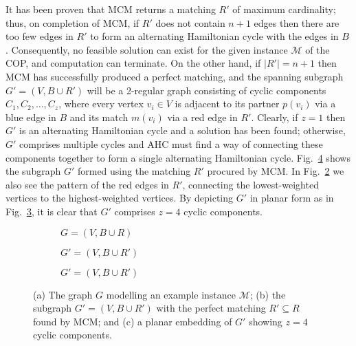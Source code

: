 \documentclass[a4paper,11pt,authoryear]{elsarticle}
\begin{document}
It has been proven that MCM returns a matching $R'$ of maximum cardinality; thus, on completion of MCM, if $R'$ does not contain $n+1$ edges then there are too few edges in $R'$ to form an alternating Hamiltonian cycle with the edges in $B$ \citep{hawa2020t}. Consequently, no feasible solution can exist for the given instance $\mathcal{M}$ of the COP, and computation can terminate. On the other hand, if $|R'|=n+1$ then MCM has successfully produced a perfect matching, and the spanning subgraph $G'=(V, B \cup R')$ will be a 2-regular graph consisting of cyclic components $C_1, C_2,\dotsc,C_z$, where every vertex $v_i \in V$ is adjacent to its partner $p(v_i)$ via a blue edge in $B$ and its match $m(v_i)$ via a red edge in $R'$. Clearly, if $z=1$ then $G'$ is an alternating Hamiltonian cycle and a solution has been found; otherwise, $G'$ comprises multiple cycles and AHC must find a way of connecting these components together to form a single alternating Hamiltonian cycle. Fig.~\ref{fig:mcm} shows the subgraph $G'$ formed using the matching $R'$ procured by MCM. In Fig.~\ref{fig:matching} we also see the pattern of the red edges in $R'$, connecting the lowest-weighted vertices to the highest-weighted vertices. By depicting $G'$ in planar form as in Fig.~\ref{fig:mps}, it is clear that $G'$ comprises $z=4$ cyclic components.


\begin{figure}[h!]	
	\centering
	\begin{subfigure}[b]{0.33\textwidth}
		
		\caption{$G = (V, B \cup R)$}
		\label{fig:threshold3}
	\end{subfigure} \hspace{5mm}
	\begin{subfigure}[b]{0.33\textwidth}
		
		\caption{$G' = (V, B \cup R')$}
		\label{fig:matching}
	\end{subfigure} \hspace{6mm}
	\begin{subfigure}[b]{0.2\textwidth}
		
		\caption{$G' = (V, B \cup R')$}
		\label{fig:mps}
	\end{subfigure}
	\caption{(a) The graph $G$ modelling an example instance $\mathcal{M}$; (b) the subgraph $G'=(V, B \cup R')$ with the perfect matching $R' \subseteq R$ found by MCM; and (c) a planar embedding of $G'$ showing $z = 4$ cyclic components.}
	\label{fig:mcm}
\end{figure}
\end{document}
